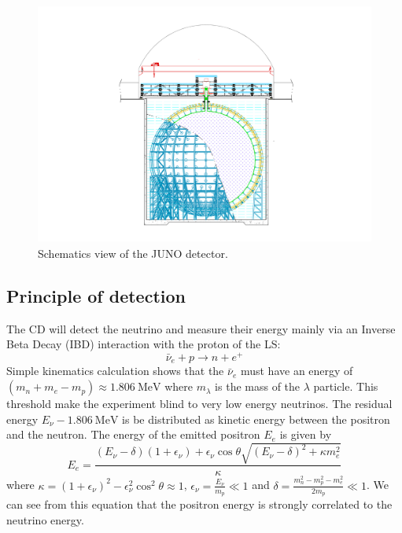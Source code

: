 \begin{figure}[ht]
  \centering
  \includegraphics[height=8cm]{images/juno/drawing_schema.png}
  \caption{Schematics view of the JUNO detector.}
  \label{fig:juno-schema}
\end{figure}

\subsection{Principle of detection}

The CD will detect the neutrino and measure their energy mainly via an Inverse Beta Decay (IBD) interaction with the proton of the LS:
\begin{equation*}
  \bar{\nu}_e + p \rightarrow n + e^+
\end{equation*}
Simple kinematics calculation shows that the $\bar{\nu}_e$ must have an energy of $ (m_n + m_e - m_p ) \approx 1.806 ~ \mathrm{MeV}$ \cite{strumia_precise_2003} where $m_\lambda$ is the mass of the $\lambda$ particle.
This threshold make the experiment blind to very low energy neutrinos. The residual energy $E_{\nu} - 1.806 ~ \mathrm{MeV}$ is be distributed as kinetic energy between the positron and the neutron.
The energy of the emitted positron $E_e$ is given by \cite{strumia_precise_2003}
\begin{equation}
  E_e = \frac{(E_\nu - \delta)(1+\epsilon_\nu) + \epsilon_\nu \cos \theta \sqrt{(E_\nu - \delta)^2 + \kappa m_e^2}}{\kappa}
\end{equation}
where $\kappa = (1 + \epsilon_\nu)^2 - \epsilon_\nu^2 \cos^2 \theta \approx 1$, $\epsilon_\nu = \frac{E_\nu}{m_p} \ll 1$ and $\delta = \frac{m_n^2 - m_p^2 - m_e^2}{2m_p} \ll 1$.
We can see from this equation that the positron energy is strongly correlated to the neutrino energy.

